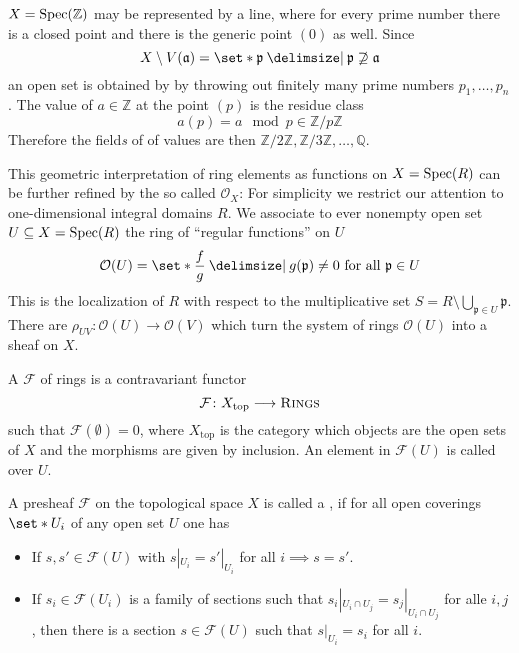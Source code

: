 \begin{example}
	$X= \operatorname{Spec}(\mathbb{Z})$ may be represented by a line, where for every prime number there is a closed point and there is the generic point $(0)$ as well.
	Since
	\[
		X \setminus V(\mathfrak{a}) = \set*{\mathfrak{p} \given \mathfrak{p} \not\supseteq \mathfrak{a}}
	\]
	an open set is obtained by by throwing out finitely many prime numbers $p_1, \ldots, p_n$.
	The value of $a \in \mathbb{Z}$ at the point $(p)$ is the residue class
	\[
		a(p) = a \mod p \in \mathbb{Z}/p \mathbb{Z}
	\]
	Therefore the field\emph{s} of of values are then $\mathbb{Z}/2 \mathbb{Z}, \mathbb{Z}/3 \mathbb{Z}, \ldots , \mathbb{Q}$.
\end{example}

This geometric interpretation of ring elements as functions on $X=\operatorname{Spec}(R)$ can be further refined by the so called  $\mathcal{O}_X$:
For simplicity we restrict our attention to one-dimensional integral domains $R$.
We associate to ever nonempty open set $U \subseteq X = \operatorname{Spec}(R)$ the ring of \enquote{regular functions} on $U$
\[
	\mathcal{O}(U) = \set*{\frac{f}{g} \given g(\mathfrak{p}) \neq 0 \text{ for all } \mathfrak{p} \in  U}
\]
This is the localization of $R$ with respect to the multiplicative set $S = R \setminus \bigcup_{\mathfrak{p} \in U} \mathfrak{p}$.
There are  $\rho_{UV} \colon \mathcal{O}(U) \to \mathcal{O}(V)$ which turn the system of rings $\mathcal{O}(U)$ into a sheaf on $X$.

\begin{definition}[{name=[presheaf]}]
	A  $\mathcal{F}$ of rings is a contravariant functor
	\[
		\mathcal{F} \colon X_{\mathrm{top}} \longrightarrow \textsc{Rings}
	\]
	such that $\mathcal{F}(\emptyset)=0$, where $X_{\mathrm{top}}$ is the category which objects are the open sets of $X$ and the morphisms are given by inclusion.
	An element in $\mathcal{F}(U)$ is called  over $U$.
\end{definition}

\begin{definition}[{name=[sheaf]}]
	A presheaf $\mathcal{F}$ on the topological space $X$ is called a , if for all open coverings $\set*{U_i}$ of any open set $U$ one has
	\begin{itemize}[(i)]
		\item If $s,s' \in \mathcal{F}(U)$ with $s|_{U_i} = s'|_{U_i}$ for all $i \implies s=s'$.
		\item If $s_i \in \mathcal{F}(U_i)$ is a family of sections such that $s_i|_{U_i \cap U_j} = s_j|_{U_i \cap U_j}$ for alle $i,j$, then there is a section $s \in \mathcal{F}(U)$ such that $s|_{U_i} = s_i$ for all $i$.
	\end{itemize}
\end{definition}

